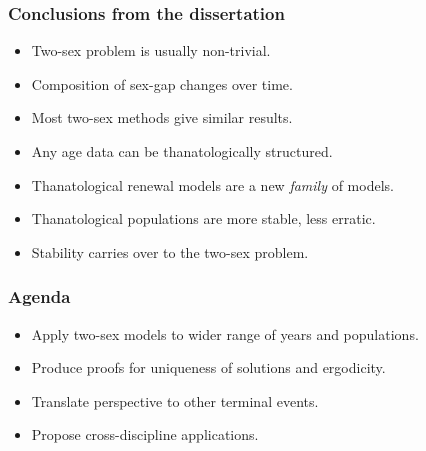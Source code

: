 \documentclass{beamer}
\begin{document}
\begin{frame}
  \frametitle{Conclusions from the dissertation}
  \begin{itemize}[<+->]
    \item Two-sex problem is usually non-trivial.
    \item Composition of sex-gap changes over time.
    \item Most two-sex methods give similar results.
    \item Any age data can be thanatologically structured.
    \item Thanatological renewal models are a new \textit{family} of models.
    \item Thanatological populations are more stable, less erratic.
    \item Stability carries over to the two-sex problem.
  \end{itemize}
\end{frame}


\begin{frame}
  \frametitle{Agenda}
  \begin{itemize}[<+->]
    \item Apply two-sex models to wider range of years and populations.
    \item Produce proofs for uniqueness of solutions and ergodicity.
    \item Translate perspective to other terminal events.
    \item Propose cross-discipline applications.
  \end{itemize}
\end{frame}

\end{document}

